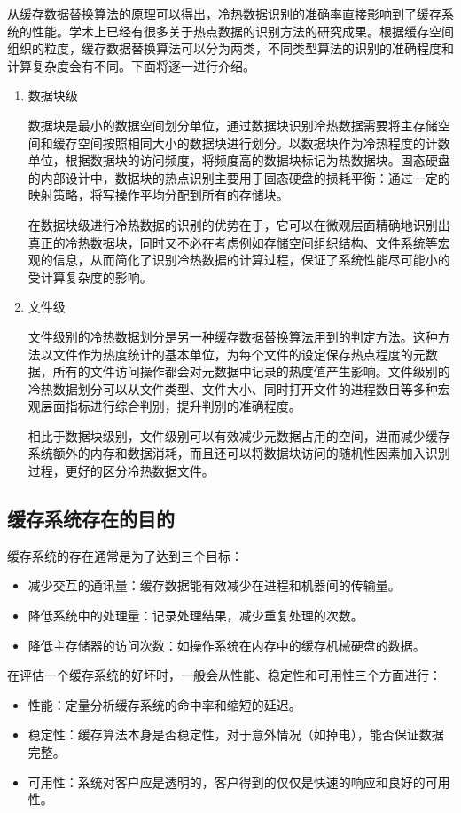 从缓存数据替换算法的原理可以得出，冷热数据识别的准确率直接影响到了缓存系统的性能。学术上已经有很多关于热点数据的识别方法的研究成果。根据缓存空间组织的粒度，缓存数据替换算法可以分为两类，不同类型算法的识别的准确程度和计算复杂度会有不同。下面将逐一进行介绍。

\begin{enumerate}
\item 数据块级

数据块是最小的数据空间划分单位，通过数据块识别冷热数据需要将主存储空间和缓存空间按照相同大小的数据块进行划分。以数据块作为冷热程度的计数单位，根据数据块的访问频度，将频度高的数据块标记为热数据块。固态硬盘的内部设计中，数据块的热点识别主要用于固态硬盘的损耗平衡：通过一定的映射策略，将写操作平均分配到所有的存储块。

在数据块级进行冷热数据的识别的优势在于，它可以在微观层面精确地识别出真正的冷热数据块，同时又不必在考虑例如存储空间组织结构、文件系统等宏观的信息，从而简化了识别冷热数据的计算过程，保证了系统性能尽可能小的受计算复杂度的影响。

\item 文件级

文件级别的冷热数据划分\cite{linlin2011}是另一种缓存数据替换算法用到的判定方法。这种方法以文件作为热度统计的基本单位，为每个文件的设定保存热点程度的元数据，所有的文件访问操作都会对元数据中记录的热度值产生影响。文件级别的冷热数据划分可以从文件类型、文件大小、同时打开文件的进程数目等多种宏观层面指标进行综合判别，提升判别的准确程度。

相比于数据块级别，文件级别可以有效减少元数据占用的空间，进而减少缓存系统额外的内存和数据消耗，而且还可以将数据块访问的随机性因素加入识别过程，更好的区分冷热数据文件。
\end{enumerate}

\subsection{缓存系统存在的目的}
缓存系统的存在通常是为了达到三个目标：
\begin{itemize}
\item 减少交互的通讯量：缓存数据能有效减少在进程和机器间的传输量。
\item 降低系统中的处理量：记录处理结果，减少重复处理的次数。
\item 降低主存储器的访问次数：如操作系统在内存中的缓存机械硬盘的数据。
\end{itemize}

在评估一个缓存系统的好坏时，一般会从性能、稳定性和可用性三个方面进行：
\begin{itemize}
\item 性能：定量分析缓存系统的命中率和缩短的延迟。
\item 稳定性：缓存算法本身是否稳定性，对于意外情况（如掉电），能否保证数据完整。
\item 可用性：系统对客户应是透明的，客户得到的仅仅是快速的响应和良好的可用性。
\end{itemize}

